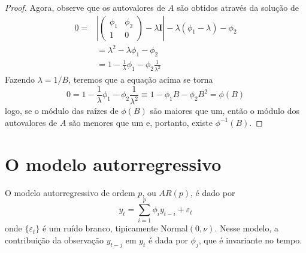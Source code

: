 \documentclass[
  letterpaper,
  DIV=11,
  numbers=noendperiod]{scrartcl}
\theoremstyle{plain}
\theoremstyle{plain}
\theoremstyle{definition}
\theoremstyle{definition}
\theoremstyle{remark}
\begin{document}
\begin{proof}
Agora, observe que os autovalores de \(A\) são obtidos através da
solução de\\
\[\begin{align}0=&\left|\left(\begin{array}{cc}\phi_1 & \phi_2 \\ 1 & 0\end{array}\right)-\lambda \textbf{I}\right|-\lambda(\phi_1-\lambda)-\phi_2\\&=\lambda^2-\lambda \phi_1-\phi_2\\
&=1-\frac{1}{\lambda}\phi_1-\phi_2\frac{1}{\lambda^2}\end{align}\]
Fazendo \(\lambda = 1/B\), teremos que a equação acima se torna
\[0=1-\frac{1}{\lambda}\phi_1-\phi_2\frac{1}{\lambda^2}\equiv 1-\phi_1 B-\phi_2B^2=\phi(B)\]
logo, se o módulo das raízes de \(\phi(B)\) são maiores que um, então o
módulo dos autovalores de \(A\) são menores que um e, portanto, existe
\(\phi^{-1}(B)\).

\end{proof}

\hypertarget{o-modelo-autorregressivo}{%
\section{O modelo autorregressivo}\label{o-modelo-autorregressivo}}

O modelo autorregressivo de ordem \(p\), ou \(AR(p)\), é dado por
\[\begin{equation}
        y_t = \sum_{i=1}^{p}\phi_iy_{t-i} +\varepsilon_t
\end{equation}\] onde \(\{\varepsilon_t\}\) é um ruído branco,
tipicamente Normal\((0,\nu)\). Nesse modelo, a contribuição da
observação \(y_{t-j}\) em \(y_t\) é dada por \(\phi_j\), que é
invariante no tempo.
\end{document}
